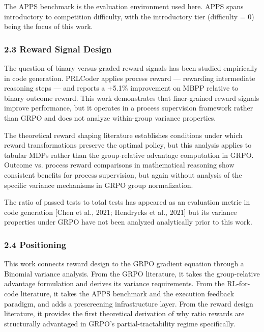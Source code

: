 The APPS benchmark \citep{Hendrycks2021} is the evaluation environment used here. APPS spans introductory to competition difficulty, with the introductory tier (difficulty = 0) being the focus of this work.

\subsubsection{2.3 Reward Signal Design}

The question of binary versus graded reward signals has been studied empirically in code generation. PRLCoder \citep{Ye2025} applies process reward --- rewarding intermediate reasoning steps --- and reports a +5.1\% improvement on MBPP relative to binary outcome reward. This work demonstrates that finer-grained reward signals improve performance, but it operates in a process supervision framework rather than GRPO and does not analyze within-group variance properties.

The theoretical reward shaping literature \citep{Ng1999} establishes conditions under which reward transformations preserve the optimal policy, but this analysis applies to tabular MDPs rather than the group-relative advantage computation in GRPO. Outcome vs. process reward comparisons \citep{Lightman2024} in mathematical reasoning show consistent benefits for process supervision, but again without analysis of the specific variance mechanisms in GRPO group normalization.

The ratio of passed tests to total tests has appeared as an evaluation metric in code generation [Chen et al., 2021; Hendrycks et al., 2021] but its variance properties under GRPO have not been analyzed analytically prior to this work.

\subsubsection{2.4 Positioning}

This work connects reward design to the GRPO gradient equation through a Binomial variance analysis. From the GRPO literature, it takes the group-relative advantage formulation and derives its variance requirements. From the RL-for-code literature, it takes the APPS benchmark and the execution feedback paradigm, and adds a prescreening infrastructure layer. From the reward design literature, it provides the first theoretical derivation of why ratio rewards are structurally advantaged in GRPO's partial-tractability regime specifically.

